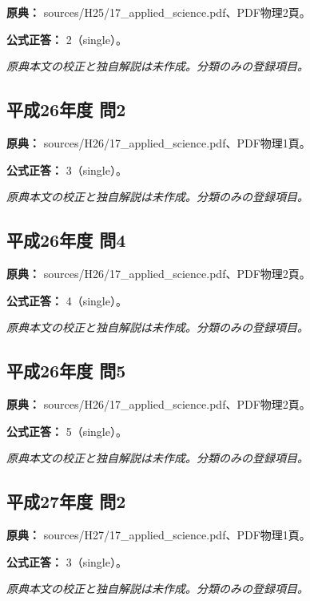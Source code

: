\noindent\textbf{原典：} sources/H25/17\_applied\_science.pdf、PDF物理2頁。

\textbf{公式正答：} 2（single）。

\par\textit{原典本文の校正と独自解説は未作成。分類のみの登録項目。}

\subsection{平成26年度 問2}
\label{q:h26-reg-applied-02}

\noindent\textbf{原典：} sources/H26/17\_applied\_science.pdf、PDF物理1頁。

\textbf{公式正答：} 3（single）。

\par\textit{原典本文の校正と独自解説は未作成。分類のみの登録項目。}

\subsection{平成26年度 問4}
\label{q:h26-reg-applied-04}

\noindent\textbf{原典：} sources/H26/17\_applied\_science.pdf、PDF物理2頁。

\textbf{公式正答：} 4（single）。

\par\textit{原典本文の校正と独自解説は未作成。分類のみの登録項目。}

\subsection{平成26年度 問5}
\label{q:h26-reg-applied-05}

\noindent\textbf{原典：} sources/H26/17\_applied\_science.pdf、PDF物理2頁。

\textbf{公式正答：} 5（single）。

\par\textit{原典本文の校正と独自解説は未作成。分類のみの登録項目。}

\subsection{平成27年度 問2}
\label{q:h27-reg-applied-02}

\noindent\textbf{原典：} sources/H27/17\_applied\_science.pdf、PDF物理1頁。

\textbf{公式正答：} 3（single）。

\par\textit{原典本文の校正と独自解説は未作成。分類のみの登録項目。}

